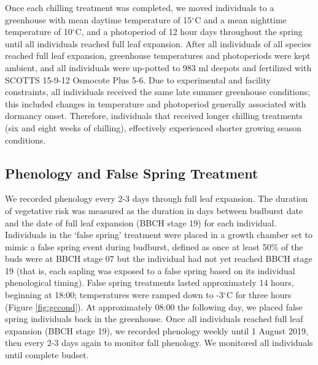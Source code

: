 \documentclass{article}\usepackage[]{graphicx}\usepackage[]{color}
\begin{document}
\begin{enumerate}
Once each chilling treatment was completed, we moved individuals to a greenhouse with mean daytime temperature of 15$^{\circ}$C and a mean nighttime temperature of 10$^{\circ}$C, and a photoperiod of 12 hour days throughout the spring until all individuals reached full leaf expansion. After all individuals of all species reached full leaf expansion, greenhouse temperatures and photoperiods were kept ambient, and all individuals were up-potted to 983 ml deepots and fertilized with SCOTTS 15-9-12 Osmocote Plus 5-6. Due to experimental and facility constraints, all individuals received the same late summer greenhouse conditions; this included changes in temperature and photoperiod generally associated with dormancy onset. Therefore, individuals that received longer chilling treatments (six and eight weeks of chilling), effectively experienced shorter growing season conditions. 

\subsection*{Phenology and False Spring Treatment} 
We recorded phenology \citep[using the BBCH scale,][]{Meier2001} every 2-3 days through full leaf expansion. The duration of vegetative risk \citep{Chamberlain2019} was measured as the duration in days between budburst date \citep[][BBCH07 stage;]{Finn2007} and the date of full leaf expansion (BBCH stage 19) for each individual. Individuals in the `false spring' treatment were placed in a growth chamber set to mimic a false spring event during budburst, defined as once at least 50\% of the buds were at BBCH stage 07 but the individual had not yet reached BBCH stage 19 (that is, each sapling was exposed to a false spring based on its individual phenological timing). False spring treatments lasted approximately 14 hours, beginning at 18:00; temperatures were ramped down to -3$^{\circ}$C for three hours (Figure \ref{fig:gccond}). At approximately 08:00 the following day, we placed false spring individuals back in the greenhouse. Once all individuals reached full leaf expansion (BBCH stage 19), we recorded phenology weekly until 1 August 2019, then every 2-3 days again to monitor fall phenology. We monitored all individuals until complete budset. 


\end{enumerate}
\end{document}
